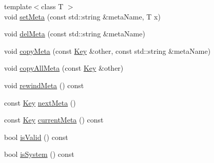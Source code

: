 \begin{DoxyCompactItemize}
{\footnotesize template$<$class T $>$ }\\void \hyperlink{classkdb_1_1Key_a4c5a3d463127ade0b766c4298002daa3}{set\-Meta} (const std\-::string \&meta\-Name, T x)
\begin{DoxyCompactList}\small\item\em \end{DoxyCompactList}\item 
void \hyperlink{classkdb_1_1Key_a2305da805095605aca38d53f2733fb57}{del\-Meta} (const std\-::string \&meta\-Name)
\item 
void \hyperlink{classkdb_1_1Key_a53f6d2196a7f17c4bdc544207bdc5f4c}{copy\-Meta} (const \hyperlink{classkdb_1_1Key}{Key} \&other, const std\-::string \&meta\-Name)
\begin{DoxyCompactList}\small\item\em \end{DoxyCompactList}\item 
void \hyperlink{classkdb_1_1Key_aec0910bf293db33deac6a3f81359cb48}{copy\-All\-Meta} (const \hyperlink{classkdb_1_1Key}{Key} \&other)
\begin{DoxyCompactList}\small\item\em \end{DoxyCompactList}\item 
void \hyperlink{classkdb_1_1Key_adf6171b76e01c2b84c6050d43673dd97}{rewind\-Meta} () const 
\begin{DoxyCompactList}\small\item\em \end{DoxyCompactList}\item 
const \hyperlink{classkdb_1_1Key}{Key} \hyperlink{classkdb_1_1Key_a855f37fef58a4ea4006d9e281f66cfe1}{next\-Meta} ()
\begin{DoxyCompactList}\small\item\em \end{DoxyCompactList}\item 
const \hyperlink{classkdb_1_1Key}{Key} \hyperlink{classkdb_1_1Key_a2be586ccd64cd280561ba5cd23f6ff1e}{current\-Meta} () const 
\begin{DoxyCompactList}\small\item\em \end{DoxyCompactList}\item 
bool \hyperlink{classkdb_1_1Key_acbb13cfcabb4548177e86eec1ac16d87}{is\-Valid} () const 
\item 
bool \hyperlink{classkdb_1_1Key_ac0f21b82a3d851eb3dfae53ddcfdbe48}{is\-System} () const 
\item 

\end{DoxyCompactItemize}
